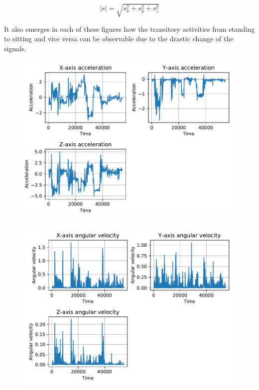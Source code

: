 \begin{equation}
|s| = \sqrt{s_x^2+s_y^2+s_z^2}
\end{equation}
\label{eq:norm}



It also emerges in each of these figures how the transitory activities from standing to sitting and vice versa can be observable due to the drastic change of the signals.

\begin{figure}[htp]
\includegraphics[scale=0.55]{acceleration_susanna.pdf}
\caption{}
\label{fig:acc}
\end{figure}

\begin{figure}[htp]
\includegraphics[scale=0.55]{angular_velocity_susanna.pdf}
\caption{}
\label{fig:gyr}
\end{figure}

